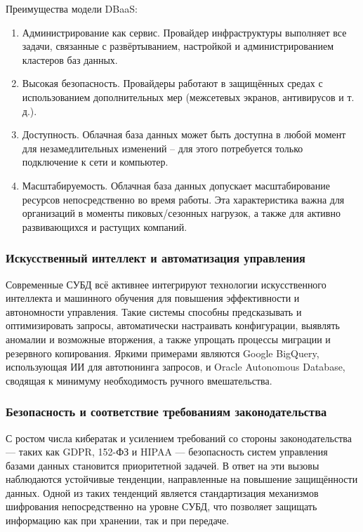 Преимущества модели DBaaS:
\begin{enumerate}
	\item Администрирование как сервис. Провайдер инфраструктуры выполняет все задачи, связанные с развёртыванием, настройкой и администрированием кластеров баз данных. 
	\item Высокая безопасность. Провайдеры работают в защищённых средах с использованием дополнительных мер (межсетевых экранов, антивирусов и т. д.).
	\item Доступность. Облачная база данных может быть доступна в любой момент для незамедлительных изменений -- для этого потребуется только подключение к сети и компьютер.
	\item Масштабируемость. Облачная база данных допускает масштабирование ресурсов непосредственно во время работы. Эта характеристика важна для организаций в моменты пиковых/сезонных нагрузок, а также для активно развивающихся и растущих компаний. 
\end{enumerate}

\subsubsection{Искусственный интеллект и автоматизация управления}

Современные СУБД всё активнее интегрируют технологии искусственного интеллекта и машинного обучения для повышения эффективности и автономности управления. Такие системы способны предсказывать и оптимизировать запросы, автоматически настраивать конфигурации, выявлять аномалии и возможные вторжения, а также упрощать процессы миграции и резервного копирования. Яркими примерами являются Google BigQuery, использующая ИИ для автотюнинга запросов, и Oracle Autonomous Database, сводящая к минимуму необходимость ручного вмешательства.

\subsubsection{Безопасность и соответствие требованиям законодательства}

С ростом числа кибератак и усилением требований со стороны законодательства — таких как GDPR, 152-ФЗ и HIPAA — безопасность систем управления базами данных становится приоритетной задачей. В ответ на эти вызовы наблюдаются устойчивые тенденции, направленные на повышение защищённости данных. Одной из таких тенденций является стандартизация механизмов шифрования непосредственно на уровне СУБД, что позволяет защищать информацию как при хранении, так и при передаче. 

